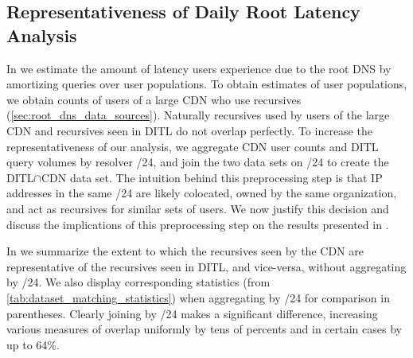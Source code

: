 \documentclass[sigconf,letterpaper,nonacm,10pt,anonymous]{acmart}
\begin{document}
\subsection{Representativeness of Daily Root Latency
Analysis}\label{representativeness-of-daily-root-latency-analysis}

\label{ap:join_by_24} In  we estimate the
amount of latency users experience due to the root DNS by amortizing
queries over user populations. To obtain estimates of user populations,
we obtain counts of users of a large CDN who use recursives
(\cref{sec:root_dns_data_sources}). Naturally recursives used by users
of the large CDN and recursives seen in DITL do not overlap perfectly.
To increase the representativeness of our analysis, we aggregate CDN
user counts and DITL query volumes by resolver /24, and join the two
data sets on /24 to create the DITL\(\cap\)CDN data set. The intuition
behind this preprocessing step is that IP addresses in the same /24 are
likely colocated, owned by the same organization, and act as recursives
for similar sets of users. We now justify this decision and discuss the
implications of this preprocessing step on the results presented in
.

In  we summarize the extent
to which the recursives seen by the CDN are representative of the
recursives seen in DITL, and vice-versa, without aggregating by /24. We
also display corresponding statistics (from
\cref{tab:dataset_matching_statistics}) when aggregating by /24 for
comparison in parentheses. Clearly joining by /24 makes a significant
difference, increasing various measures of overlap uniformly by tens of
percents and in certain cases by up to 64\%.
\end{document}
